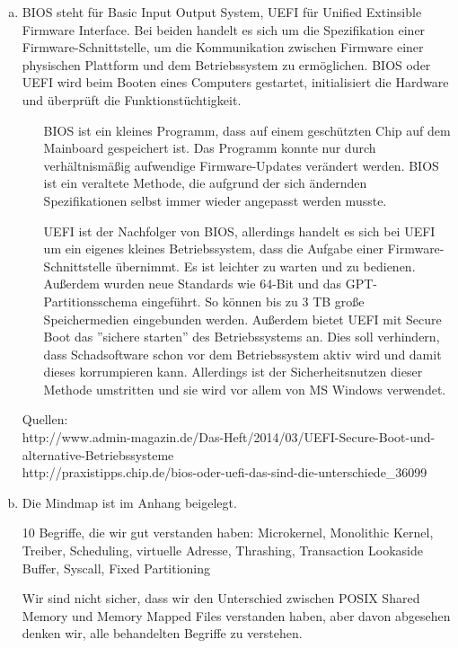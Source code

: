 \documentclass[numbers=noendperiod]{scrartcl}
\begin{document}
\begin{enumerate}[a)]
	\item BIOS steht für Basic Input Output System, UEFI für Unified Extinsible Firmware Interface. 	 Bei beiden handelt es sich um die Spezifikation einer Firmware-Schnittstelle, um die Kommunikation zwischen Firmware einer physischen Plattform und dem Betriebssystem zu ermöglichen. BIOS oder UEFI wird beim Booten eines Computers gestartet, initialisiert die Hardware und überprüft die Funktionstüchtigkeit.
	\begin{enumerate}
		\item[BIOS] ist ein kleines Programm, dass auf einem geschützten Chip auf dem Mainboard gespeichert ist. Das Programm konnte nur durch verhältnismäßig aufwendige Firmware-Updates verändert werden. BIOS ist ein veraltete Methode, die aufgrund der sich ändernden Spezifikationen selbst immer wieder angepasst werden musste.
		\item[UEFI] ist der Nachfolger von BIOS, allerdings handelt es sich bei UEFI um ein eigenes kleines Betriebssystem, dass die Aufgabe einer Firmware-Schnittstelle übernimmt. Es ist leichter zu warten und zu bedienen. Außerdem wurden neue Standards wie 64-Bit und das GPT-Partitionsschema eingeführt. So können bis zu 3 TB große Speichermedien eingebunden werden. Außerdem bietet UEFI mit Secure Boot das ''sichere starten'' des Betriebssystems an. Dies soll verhindern, dass Schadsoftware schon vor dem Betriebssystem aktiv wird und damit dieses korrumpieren kann. Allerdings ist der Sicherheitsnutzen dieser Methode umstritten und sie wird vor allem von MS Windows verwendet. 
	\end{enumerate}
	Quellen: \\
	http://www.admin-magazin.de/Das-Heft/2014/03/UEFI-Secure-Boot-und-alternative-Betriebssysteme \\
	http://praxistipps.chip.de/bios-oder-uefi-das-sind-die-unterschiede\_36099
	
	
	\item Die Mindmap ist im Anhang beigelegt.
	
	10 Begriffe, die wir gut verstanden haben:
	Microkernel, Monolithic Kernel, Treiber, Scheduling, virtuelle Adresse, Thrashing, Transaction Lookaside Buffer, Syscall, Fixed Partitioning
	
	Wir sind nicht sicher, dass wir den Unterschied zwischen POSIX Shared Memory und Memory Mapped Files verstanden haben, aber davon abgesehen denken wir, alle behandelten Begriffe zu verstehen.
\end{enumerate}
\end{document}
